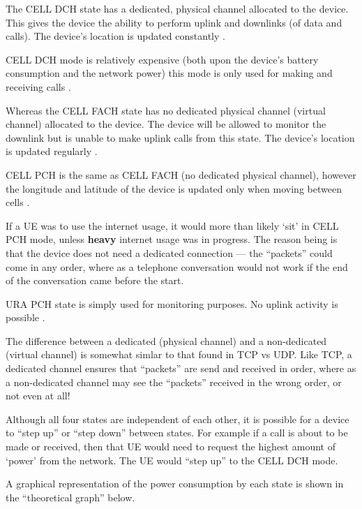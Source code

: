 The CELL DCH state has a dedicated, physical channel allocated to the device. 
This gives the device the ability to perform uplink and downlinks (of data and 
calls). The device's location is updated constantly \citep{umtsworld}.

CELL DCH mode is relatively expensive (both upon the device's battery 
consumption and the network power) this mode is only used for making and 
receiving calls \citep{umtsworld}.

Whereas the CELL FACH state has no dedicated physical channel (virtual channel) 
allocated to the device. The device will be allowed to monitor the downlink but
is unable to make uplink calls from this state. The device's location is 
updated regularly \citep{umtsworld}.

CELL PCH is the same as CELL FACH (no dedicated physical channel), however the 
longitude and latitude of the device is updated only when moving between cells 
\citep{umtsworld}. 

If a UE was to use the internet usage, it would more than likely `sit' in CELL 
PCH mode, unless {\bf heavy} internet usage was in progress. The reason being
is that the device does not need a dedicated connection --- the ``packets'' 
could come in any order, where as a telephone conversation would not work if 
the end of the conversation came before the start.

URA PCH state is simply used for monitoring purposes. No uplink activity is 
possible \citep{umtsworld}.

The difference between a dedicated (physical channel) and a non-dedicated 
(virtual channel) is somewhat simlar to that found in TCP vs UDP. Like TCP, a
dedicated channel ensures that ``packets'' are send and received in order, 
where as a non-dedicated channel may see the ``packets'' received in the wrong 
order, or not even at all!

Although all four states are independent of each other, it is possible for a 
device to ``step up'' or ``step down'' between states. For example if a call is
about to be made or received, then that UE would need to request the highest 
amount of `power' from the network. The UE would ``step up'' to the CELL DCH 
mode.

A graphical representation of the power consumption by each state is shown 
in the ``theoretical graph'' below.


